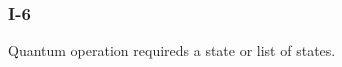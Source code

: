 \subsubsection{I-6}\label{sec:error_code_i_6}

Quantum operation requireds a state or list of states.

